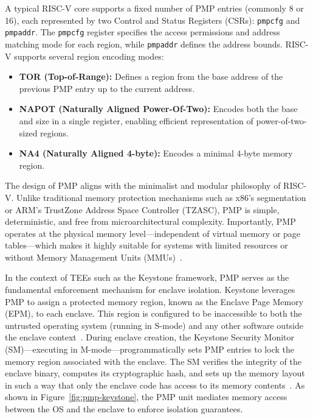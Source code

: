 A typical RISC-V core supports a fixed number of PMP entries (commonly 8 or 16), each represented by two Control and Status Registers (CSRs): \texttt{pmpcfg} and \texttt{pmpaddr}. The \texttt{pmpcfg} register specifies the access permissions and address matching mode for each region, while \texttt{pmpaddr} defines the address bounds. RISC-V supports several region encoding modes:

\begin{itemize}
    \item \textbf{TOR (Top-of-Range):} Defines a region from the base address of the previous PMP entry up to the current address.
    \item \textbf{NAPOT (Naturally Aligned Power-Of-Two):} Encodes both the base and size in a single register, enabling efficient representation of power-of-two-sized regions.
    \item \textbf{NA4 (Naturally Aligned 4-byte):} Encodes a minimal 4-byte memory region.
\end{itemize}

The design of PMP aligns with the minimalist and modular philosophy of RISC-V. Unlike traditional memory protection mechanisms such as x86's segmentation or ARM's TrustZone Address Space Controller (TZASC), PMP is simple, deterministic, and free from microarchitectural complexity. Importantly, PMP operates at the physical memory level—independent of virtual memory or page tables—which makes it highly suitable for systems with limited resources or without Memory Management Units (MMUs)~\cite{riscvprivspec,Survey2023}.

In the context of TEEs such as the Keystone framework, PMP serves as the fundamental enforcement mechanism for enclave isolation. Keystone leverages PMP to assign a protected memory region, known as the Enclave Page Memory (EPM), to each enclave. This region is configured to be inaccessible to both the untrusted operating system (running in S-mode) and any other software outside the enclave context~\cite{Lee2019}. During enclave creation, the Keystone Security Monitor (SM)—executing in M-mode—programmatically sets PMP entries to lock the memory region associated with the enclave. The SM verifies the integrity of the enclave binary, computes its cryptographic hash, and sets up the memory layout in such a way that only the enclave code has access to its memory contents~\cite{Lee2019,keystone2025how}.
As shown in Figure~\ref{fig:pmp-keystone}, the PMP unit mediates memory access between the OS and the enclave to enforce isolation guarantees.

